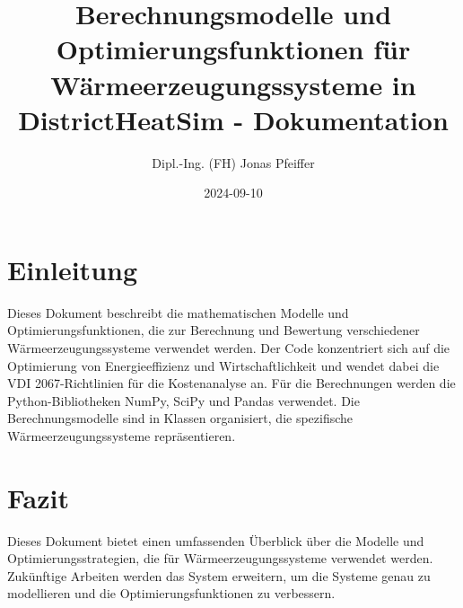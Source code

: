 \documentclass{article}
\title{Berechnungsmodelle und Optimierungsfunktionen für Wärmeerzeugungssysteme in DistrictHeatSim - Dokumentation}
\author{Dipl.-Ing. (FH) Jonas Pfeiffer}
\date{2024-09-10}
\begin{document}
\maketitle

\tableofcontents

\section{Einleitung}
Dieses Dokument beschreibt die mathematischen Modelle und Optimierungsfunktionen, die zur Berechnung und Bewertung verschiedener Wärmeerzeugungssysteme verwendet werden. Der Code konzentriert sich auf die Optimierung von Energieeffizienz und Wirtschaftlichkeit und wendet dabei die VDI 2067-Richtlinien für die Kostenanalyse an. Für die Berechnungen werden die Python-Bibliotheken NumPy, SciPy und Pandas verwendet. Die Berechnungsmodelle sind in Klassen organisiert, die spezifische Wärmeerzeugungssysteme repräsentieren.
















\section{Fazit}
Dieses Dokument bietet einen umfassenden Überblick über die Modelle und Optimierungsstrategien, die für Wärmeerzeugungssysteme verwendet werden. Zukünftige Arbeiten werden das System erweitern, um die Systeme genau zu modellieren und die Optimierungsfunktionen zu verbessern.
\end{document}
